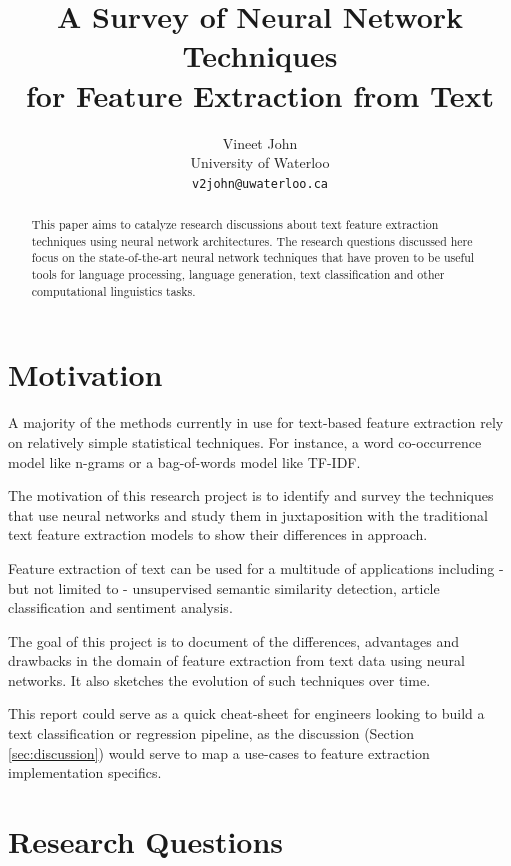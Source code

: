 \documentclass[11pt,a4paper]{article}
\title{A Survey of Neural Network Techniques\\ for Feature Extraction from Text}
\author{
  Vineet John \\
  University of Waterloo \\
  {\tt v2john@uwaterloo.ca} \\
}
\date{}
\begin{document}
\maketitle


\begin{abstract}
  This paper aims to catalyze research discussions about text feature extraction techniques using neural network architectures.
  The research questions discussed here focus on the state-of-the-art neural network techniques that have proven to be useful tools for language processing, language generation, text classification and other computational linguistics tasks.
\end{abstract}

\section{Motivation} %
\label{sec:motivation}

  A majority of the methods currently in use for text-based feature extraction rely on relatively simple statistical techniques. For instance, a word co-occurrence model like n-grams or a bag-of-words model like TF-IDF.

  The motivation of this research project is to identify and survey the techniques that use neural networks and study them in juxtaposition with the traditional text feature extraction models to show their differences in approach.

  Feature extraction of text can be used for a multitude of applications including - but not limited to - unsupervised semantic similarity detection, article classification and sentiment analysis.

  The goal of this project is to document of the differences, advantages and drawbacks in the domain of feature extraction from text data using neural networks. It also sketches the evolution of such techniques over time.

  This report could serve as a quick cheat-sheet for engineers looking to build a text classification or regression pipeline, as the discussion (Section \ref{sec:discussion}) would serve to map a use-cases to feature extraction implementation specifics.


\section{Research Questions} %
\label{sec:research_questions}
\end{document}
